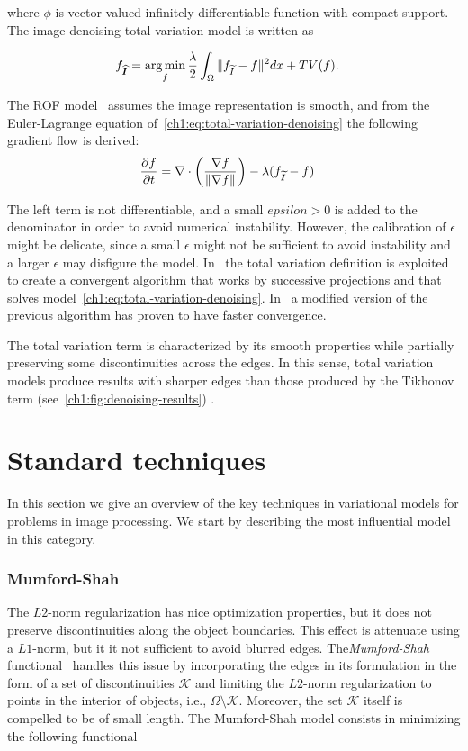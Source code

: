 where $\phi$ is vector-valued infinitely differentiable function with compact support. The image denoising total variation model is written as

\begin{align}
	f_{\bm{\widehat{I}}} &= \operatorname*{arg\,min}_{f} \frac{\lambda}{2} \int_{\Omega}{ \lVert f_{\widetilde{I}} - f\rVert^2dx} + TV(f).
	\label{ch1:eq:total-variation-denoising}
\end{align}

The ROF model~\cite{rudin92} assumes the image representation is smooth, and from the Euler-Lagrange equation of~\cref{ch1:eq:total-variation-denoising} the following gradient flow is derived:
\begin{align*}
	\frac{\partial f}{\partial t} &= \nabla \cdot \left( \frac{\nabla f}{\lVert \nabla f\rVert } \right) - \lambda (f_{\widetilde{\bm{I}}} - f)
\end{align*}

The left term is not differentiable, and a small $epsilon >0$ is added to the denominator in order to avoid numerical instability. However, the calibration of $\epsilon$ might be delicate, since a small $\epsilon$ might not be sufficient to avoid instability and a larger $\epsilon$ may disfigure the model. In~\cite{chambolle04} the total variation definition is exploited to create a convergent algorithm that works by successive projections and that solves model~\cref{ch1:eq:total-variation-denoising}. In~\cite{beck09a} a modified version of the previous algorithm has proven to have faster convergence. 

The total variation term is characterized by its smooth properties while partially preserving some discontinuities across the edges. In this sense, total variation models produce results with sharper edges than those produced by the Tikhonov term (see~\cref{ch1:fig:denoising-results}) .

\section{Standard techniques}

In this section we give an overview of the key techniques in variational models for problems in image processing. We start by describing the most influential model in this category.

\subsubsection{Mumford-Shah}
The $L2$-norm regularization has nice optimization properties, but it does not preserve discontinuities along the object boundaries. This effect is attenuate using a $L1$-norm, but it it not sufficient to avoid blurred edges. The\emph{Mumford-Shah} functional~\cite{mumford89} handles this issue by incorporating the edges in its formulation in the form of a set of discontinuities $\mathcal{K}$ and limiting the $L2$-norm regularization to points in the interior of objects, i.e.,  $\Omega \setminus \mathcal{K}$. Moreover, the set $\mathcal{K}$ itself is compelled to be of small length. The Mumford-Shah model consists in minimizing the following functional 


